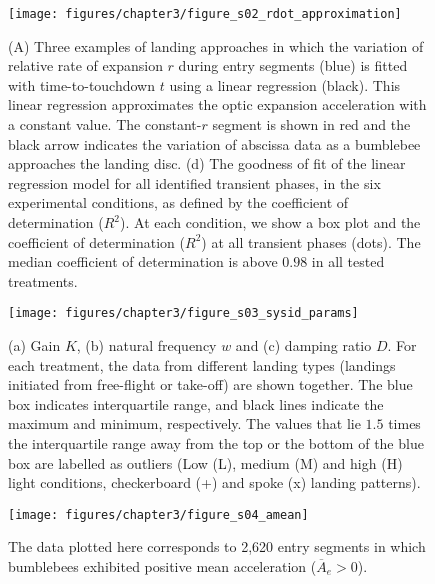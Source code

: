 \begin{figure}[H]
	\centering
	\texttt{[image: figures/chapter3/figure\_s02\_rdot\_approximation]}
	\caption{ (A) Three examples of landing approaches in which the variation of relative rate of expansion $r$ during entry segments (blue) is fitted with time-to-touchdown $t$ using a linear regression (black). This linear regression approximates the optic expansion acceleration with a constant value. The constant-$r$ segment is shown in red and the black arrow indicates the variation of abscissa data as a bumblebee approaches the landing disc. (d) The goodness of fit of the linear regression model for all identified transient phases, in the six experimental conditions, as defined by the coefficient of determination ($R^2$). At each condition, we show a box plot and the coefficient of determination ($R^2$) at all transient phases (dots). The median coefficient of determination is above $0.98$ in all tested treatments.}
	\label{figure_s02_rdot_approximation}
\end{figure}

\begin{figure}[H]
	\centering
	\texttt{[image: figures/chapter3/figure\_s03\_sysid\_params]}
	\caption{ (a) Gain $K$, (b) natural frequency $w$ and (c) damping ratio $D$. For each treatment, the data from different landing types (landings initiated from free-flight or take-off) are shown together. The blue box indicates interquartile range, and black lines indicate the maximum and minimum, respectively. The values that lie $1.5$ times the interquartile range away from the top or the bottom of the blue box are labelled as outliers (Low (L), medium (M) and high (H) light conditions, checkerboard (+) and spoke (x) landing patterns).}
	\label{figure_s03_sysid_params}
\end{figure}

\begin{figure}[H]
	\centering
	\texttt{[image: figures/chapter3/figure\_s04\_amean]}
	\caption{ The data plotted here corresponds to 2,620 entry segments in which bumblebees exhibited positive mean acceleration ($\overline{A}_e > 0$).}
	\label{figure_s04_amean}
\end{figure}



